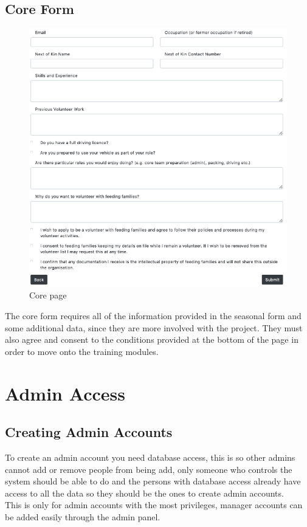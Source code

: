 \documentclass[12pt]{article}
\begin{document}
\newpage
\subsection{Core Form}

\begin{figure}[h]
    \centering
    \hspace*{-2cm}\includegraphics[scale=0.8]{main/coreadditions.png}
    \caption{Core page}
    \label{fig10}
\end{figure}

The core form requires all of the information provided in the seasonal form and some additional data, since they are more involved with the project. They must also agree and consent to the conditions provided at the bottom of the page in order to move onto the training modules.
\newpage
\section{Admin Access} %

\subsection{Creating Admin Accounts}
To create an admin account you need database access, this is so other admins cannot add or remove people from being add, only someone who controls the system should be able to do and the persons with database access already have access to all the data so they should be the ones to create admin accounts.\\
\noindent
This is only for admin accounts with the most privileges, manager accounts can be added easily through the admin panel.\\ 
\end{document}
